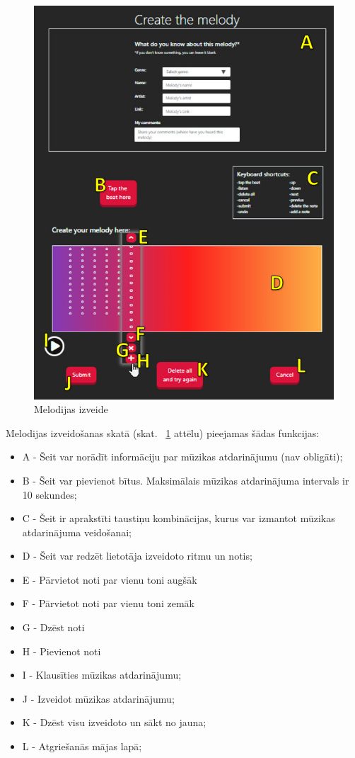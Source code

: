 \documentclass[12pt]{article}
\begin{document}
\begin{figure}[H]
\begin{center}
	\includegraphics[scale=0.6]{melody.png}
	\caption{Melodijas izveide}
	\label{fig:melody}
\end{center}
\end{figure}

Melodijas izveidošanas skatā (skat. ~\ref{fig:melody} attēlu) pieejamas šādas funkcijas:

\begin{itemize}
	\item A - Šeit var norādīt informāciju par mūzikas atdarinājumu (nav obligāti);
    \item B - Šeit var pievienot bītus. Maksimālais mūzikas atdarinājuma intervals ir 10 sekundes;
    \item C - Šeit ir aprakstīti  taustiņu kombinācijas, kurus var izmantot mūzikas atdarinājuma veidošanai;
    \item D - Šeit var redzēt lietotāja izveidoto ritmu un notis;
    \item E - Pārvietot noti par vienu toni augšāk
    \item F - Pārvietot noti par vienu toni zemāk
    \item G - Dzēst noti
    \item H - Pievienot noti
    \item I - Klausīties mūzikas atdarinājumu;
    \item J - Izveidot mūzikas atdarinājumu;
    \item K - Dzēst visu izveidoto un sākt no jauna;
    \item L - Atgriešanās mājas lapā;
\end{itemize}
\end{document}
